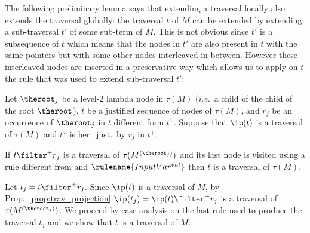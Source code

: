 The following preliminary lemma says that extending a traversal locally also extends the
traversal globally: the traversal $t$ of $M$ can be extended by
extending a sub-traversal $t'$ of some sub-term of $M$. This is
not obvious since $t'$ is a subsequence of $t$ which means that the
nodes in $t'$ are also present in $t$ with the same pointers but
with some other nodes interleaved in between. However these
interleaved nodes are inserted in a preservative way which allows us
to apply on $t$ the rule that was used to extend sub-traversal $t'$:
\begin{lemma}
\label{lem:subtraversal_progression} Let $\theroot_j$ be a level-$2$ lambda node in $\tau(M)$ ({\it i.e.}\ a child of the child of the root $\theroot$),
$t$ be a justified sequence of nodes of $\tau(M)$, and $r_j$ be an occurrence of $\theroot_j$ in $t$ different from $t^\omega$.
Suppose that $\ip(t)$ is a traversal of $\tau(M)$ and $t^\omega$ is her.\ just.\ by $r_j$ in $t^+$.

If $t \filter^+ r_j$ is a traversal of $\tau(M^{(\theroot_j)})$
and its last node is visited using a rule different from  and $\rulename{InputVar^{val}}$
then $t$ is a traversal of $\tau(M)$.
\end{lemma}
\proof Let $t_j = t \filter^+ r_j$. Since $\ip(t)$ is a traversal of
$M$, by Prop.\ \ref{prop:trav_projection} $\ip(t_j) = \ip(t)
\filter^+ r_j$ is a traversal of $\tau(M^{(\theroot_j)})$.
  We proceed by case analysis on the last rule used to produce the traversal $t_j$ and we show that $t$ is a traversal of $M$:
